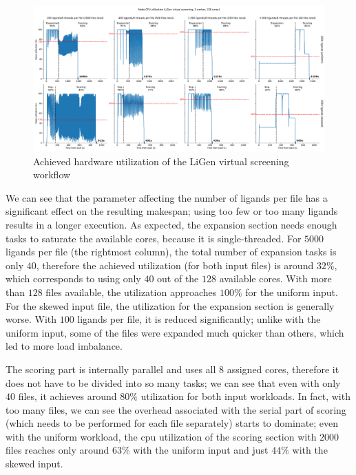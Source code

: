 \begin{figure}[h]
	\centering
	\includegraphics[width=\textwidth]{imgs/hq/charts/ligen-aggregation-utilization}
	\caption{Achieved hardware utilization of the LiGen virtual screening workflow}
	\label{fig:hq-ligen-utilization}
\end{figure}

We can see that the parameter affecting the number of ligands per file has a significant effect on
the resulting makespan; using too few or too many ligands results in a longer execution. As
expected, the expansion section needs enough tasks to saturate the available cores, because it is
single-threaded. For $5000$ ligands per file (the rightmost column), the total
number of expansion tasks is only $40$, therefore the achieved utilization (for
both input files) is around $32\%$, which corresponds to using only
$40$ out of the $128$ available cores. With more than
$128$ files available, the utilization approaches $100\%$ for the
uniform input. For the skewed input file, the utilization for the expansion section is generally
worse. With $100$ ligands per file, it is reduced significantly; unlike with the
uniform input, some of the files were expanded much quicker than others, which led to more load
imbalance.

The scoring part is internally parallel and uses all $8$ assigned cores,
therefore it does not have to be divided into so many tasks; we can see that even with only
$40$ files, it achieves around $80\%$ utilization for both
input workloads. In fact, with too many files, we can see the overhead associated with the serial
part of scoring (which needs to be performed for each file separately) starts to dominate; even
with the uniform workload, the \gls{cpu} utilization of the scoring section with
$2000$ files reaches only around $63\%$ with the uniform input
and just $44\%$ with the skewed input.

